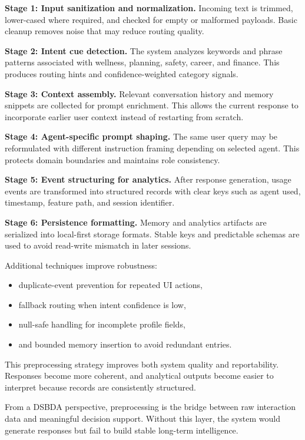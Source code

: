 \documentclass[oneside,a4paper,12pt]{report}
\begin{document}
\textbf{Stage 1: Input sanitization and normalization.} Incoming text is trimmed, lower-cased where required, and checked for empty or malformed payloads. Basic cleanup removes noise that may reduce routing quality.

\textbf{Stage 2: Intent cue detection.} The system analyzes keywords and phrase patterns associated with wellness, planning, safety, career, and finance. This produces routing hints and confidence-weighted category signals.

\textbf{Stage 3: Context assembly.} Relevant conversation history and memory snippets are collected for prompt enrichment. This allows the current response to incorporate earlier user context instead of restarting from scratch.

\textbf{Stage 4: Agent-specific prompt shaping.} The same user query may be reformulated with different instruction framing depending on selected agent. This protects domain boundaries and maintains role consistency.

\textbf{Stage 5: Event structuring for analytics.} After response generation, usage events are transformed into structured records with clear keys such as agent used, timestamp, feature path, and session identifier.

\textbf{Stage 6: Persistence formatting.} Memory and analytics artifacts are serialized into local-first storage formats. Stable keys and predictable schemas are used to avoid read-write mismatch in later sessions.

Additional techniques improve robustness:
\begin{itemize}
    \item duplicate-event prevention for repeated UI actions,
    \item fallback routing when intent confidence is low,
    \item null-safe handling for incomplete profile fields,
    \item and bounded memory insertion to avoid redundant entries.
\end{itemize}

This preprocessing strategy improves both system quality and reportability. Responses become more coherent, and analytical outputs become easier to interpret because records are consistently structured.

From a DSBDA perspective, preprocessing is the bridge between raw interaction data and meaningful decision support. Without this layer, the system would generate responses but fail to build stable long-term intelligence.
\end{document}
